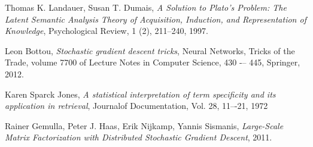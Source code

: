 \documentclass{pracamgr}
\begin{document}
\begin{thebibliography}{99}
 Thomas K. Landauer, Susan T. Dumais, \textit{A Solution to Plato's Problem: The Latent Semantic Analysis Theory of Acquisition, Induction, and Representation of Knowledge}, Psychological Review, 1 (2), 211--240, 1997.

 Leon Bottou, \textit{Stochastic gradient descent tricks}, Neural Networks, Tricks of the Trade,
volume 7700 of Lecture Notes in Computer Science, 430 -– 445, Springer, 2012.

 Karen Sparck Jones, \textit{A statistical interpretation of term specificity and its application in retrieval}, Journalof Documentation, Vol. 28, 11–-21, 1972

 Rainer Gemulla, Peter J. Haas, Erik Nijkamp, Yannis Sismanis, \textit{Large-Scale Matrix Factorization with Distributed Stochastic Gradient Descent}, 2011.

\end{thebibliography}
\end{document}
